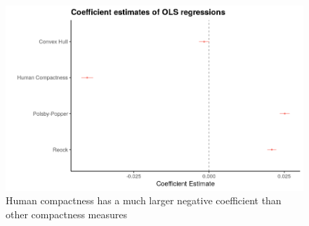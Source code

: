 \documentclass[]{article}
\begin{document}
\begin{figure}
\centering
\includegraphics{../30_results/regression_coefficients.png}
\caption{Human compactness has a much larger negative coefficient than
other compactness measures \label{regression_coefficients}}
\end{figure}
\end{document}
